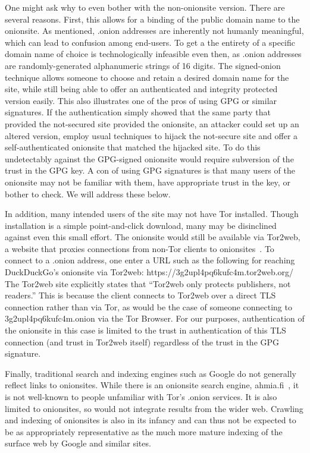 \documentclass[10pt, conference, compsocconf]{styles/IEEEtran}
\begin{document}
One might ask why to even bother with the non-onionsite version. There
are several reasons. First, this allows for a binding of the public
domain name to the onionsite. As mentioned, .onion addresses are
inherently not humanly meaningful, which can lead to confusion among 
end-users.  To get a the entirety of a specific domain name of choice is
technologically infeasible even then, as .onion addresses are
randomly-generated alphanumeric strings of 16 digits. The signed-onion
technique allows someone to choose and retain a desired domain name for the
site, while still being able to offer an authenticated and integrity
protected version easily. This also illustrates one of the pros
of using GPG or similar signatures. If the authentication simply
showed that the same party that provided the not-secured site
provided the onionsite, an attacker could set up an altered version,
employ usual techniques to hijack the not-secure site and offer
a self-authenticated onionsite that matched the hijacked site.
To do this undetectably against the GPG-signed onionsite would require
subversion of the trust in the GPG key. A con of using GPG signatures
is that many users of the onionsite may not be familiar with them,
have appropriate trust in the key, or bother to check. We will address
these below.

In addition, many intended users of the site may not have Tor installed.
Though installation is a simple point-and-click download, many may be
disinclined against even this small effort. The onionsite would still
be available via Tor2web, a website that proxies connections from
non-Tor clients to onionsites~\cite{tor2web}.  To connect to a .onion
address, one enter a URL such as the following for reaching
DuckDuckGo's onionsite via Tor2web:
https://3g2upl4pq6kufc4m.tor2web.org/ The Tor2web site explicitly
states that ``Tor2web only protects publishers, not readers.'' This is
because the client connects to Tor2web over a direct TLS connection
rather than via Tor, as would be the case of someone connecting to
3g2upl4pq6kufc4m.onion via the Tor Browser.  For our purposes,
authentication of the onionsite in this case is limited to the trust
in authentication of this TLS connection (and trust in Tor2web itself)
regardless of the trust in the GPG signature.

Finally, traditional search and indexing engines such as Google do not
generally reflect links to onionsites. While there is an onionsite
search engine, ahmia.fi~\cite{ahmia}, it is not well-known to people
unfamiliar with Tor's .onion services. It is also limited to
onionsites, so would not integrate results from the wider web.  
Crawling and indexing of onionsites is also in its infancy and can
thus not be expected to be as appropriately representative as the much
more mature indexing of the surface web by Google and similar sites.
\end{document}
